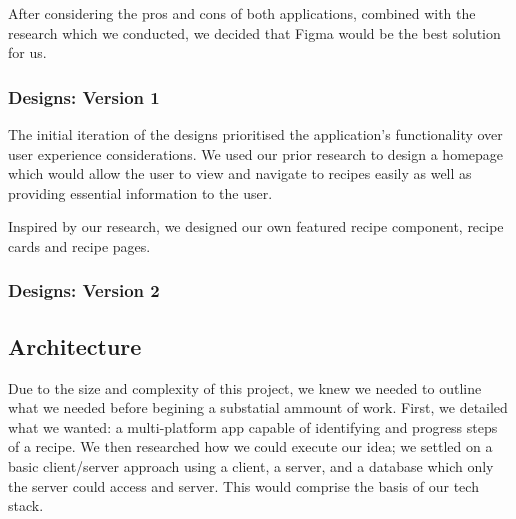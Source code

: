 \documentclass{article}
\begin{document}
    After considering the pros and cons of both applications, combined with the research which we conducted, we decided that Figma would be the best solution for us.
    
    \subsubsection{Designs: Version 1}
    The initial iteration of the designs prioritised the application's functionality over user experience considerations. We used our prior research to design a homepage which would allow the user to view and navigate to recipes easily as well as providing essential information to the user. 

    Inspired by our research, we designed our own featured recipe component, recipe cards and recipe pages. 

    \subsubsection{Designs: Version 2}

    \subsection{Architecture}
    Due to the size and complexity of this project, we knew we needed to outline what we needed before begining a substatial ammount of work. First, we detailed what we wanted: a multi-platform app capable of identifying and progress steps of a recipe. We then researched how we could execute our idea; we settled on a basic client/server approach using a client, a server, and a database which only the server could access and server. This would comprise the basis of our tech stack.
\end{document}
